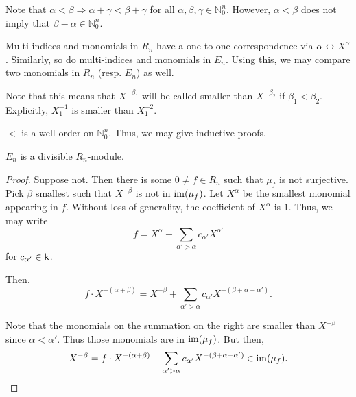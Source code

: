 \begin{rem}
	Note that $\alpha < \beta \Rightarrow \alpha + \gamma < \beta + \gamma$ for all $\alpha, \beta, \gamma \in \mathbb{N}_{0}^{n}$. However, $\alpha < \beta$ does not imply that $\beta - \alpha \in \mathbb{N}_{0}^{n}$.
\end{rem}

\begin{rem}
	Multi-indices and monomials in $R_{n}$ have a one-to-one correspondence via $\alpha \leftrightarrow X^{\alpha}$. Similarly, so do multi-indices and monomials in $E_{n}$. Using this, we may compare two monomials in $R_{n}$ (resp. $E_{n}$) as well. 

	Note that this means that $X^{-\beta_{1}}$ will be called smaller than $X^{-\beta_{2}}$ if $\beta_{1} < \beta_{2}$. Explicitly, $X_{1}^{-1}$ is smaller than $X_{1}^{-2}$.
\end{rem}

\begin{rem}
	$<$ is a well-order on $\mathbb{N}_{0}^{n}$. Thus, we may give inductive proofs.
\end{rem}

\begin{prop}
	$E_{n}$ is a divisible $R_{n}$-module.
\end{prop}
\begin{proof} 
	Suppose not. Then there is some $0 \neq f \in R_{n}$ such that $\mu_{f}$ is not surjective. Pick $\beta$ smallest such that $X^{-\beta}$ is not in $\operatorname{im}(\mu_{f})$. Let $X^{\alpha}$ be the smallest monomial appearing in $f$. Without loss of generality, the coefficient of $X^{\alpha}$ is $1$. Thus, we may write
	\begin{equation*} 
		f = X^{\alpha} + \sum_{\alpha' > \alpha} c_{\alpha'} X^{\alpha'}
	\end{equation*}
	for $c_{\alpha'} \in \mathsf{k}$.

	Then,
	\begin{equation*} 
		f \cdot X^{-(\alpha + \beta)} = X^{-\beta} + \sum_{\alpha' > \alpha} c_{\alpha'} X^{-(\beta + \alpha - \alpha')}.
	\end{equation*}

	Note that the monomials on the summation on the right are smaller than $X^{-\beta}$ since $\alpha < \alpha'$. Thus those monomials are in $\operatorname{im}(\mu_{f})$. But then,
	\begin{equation*} 
		X^{-\beta} =  f \cdot X^{-(\alpha + \beta)} - \sum_{\alpha' > \alpha} c_{\alpha'} X^{-(\beta + \alpha - \alpha')} \in \operatorname{im}(\mu_{f}). \qedhere
	\end{equation*}
\end{proof}

